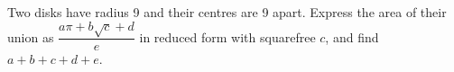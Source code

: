 Two disks have radius 9 and their centres are 9 apart. Express the area of their union as $\dfrac{a\pi+b\sqrt c+d}{e}$ in reduced form with squarefree $c$, and find $a+b+c+d+e$.
